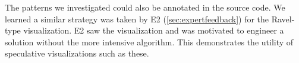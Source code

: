 The patterns we investigated could also be annotated in the source code. We learned a similar strategy was taken by E2 (\autoref{sec:expertfeedback}) for the Ravel-type visualization. E2 saw the visualization and was motivated to engineer a solution without the more intensive algorithm. This demonstrates the utility of speculative visualizations such as these. 

